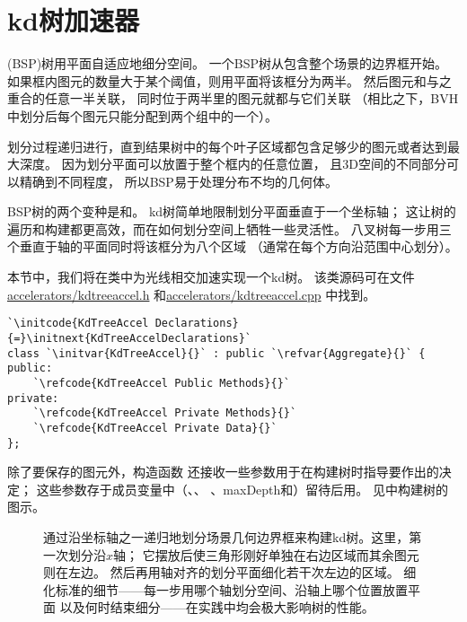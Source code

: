 \section{kd树加速器}\label{sec:kd树加速器}

(BSP)树用平面自适应地细分空间。
一个BSP树从包含整个场景的边界框开始。
如果框内图元的数量大于某个阈值，则用平面将该框分为两半。
然后图元和与之重合的任意一半关联，
同时位于两半里的图元就都与它们关联
（相比之下，BVH中划分后每个图元只能分配到两个组中的一个）。

划分过程递归进行，直到结果树中的每个叶子区域都包含足够少的图元或者达到最大深度。
因为划分平面可以放置于整个框内的任意位置，
且3D空间的不同部分可以精确到不同程度，
所以BSP易于处理分布不均的几何体。

BSP树的两个变种是和。
kd树简单地限制划分平面垂直于一个坐标轴；
这让树的遍历和构建都更高效，而在如何划分空间上牺牲一些灵活性。
八叉树每一步用三个垂直于轴的平面同时将该框分为八个区域
（通常在每个方向沿范围中心划分）。

本节中，我们将在类中为光线相交加速实现一个kd树。
该类源码可在文件\href{https://github.com/mmp/pbrt-v3/tree/master/src/accelerators/kdtreeaccel.h}{\ttfamily accelerators/kdtreeaccel.h}
和\href{https://github.com/mmp/pbrt-v3/tree/master/src/accelerators/kdtreeaccel.cpp}{\ttfamily accelerators/kdtreeaccel.cpp}
中找到。

\begin{lstlisting}
`\initcode{KdTreeAccel Declarations}{=}\initnext{KdTreeAccelDeclarations}`
class `\initvar{KdTreeAccel}{}` : public `\refvar{Aggregate}{}` {
public:
    `\refcode{KdTreeAccel Public Methods}{}`
private:
    `\refcode{KdTreeAccel Private Methods}{}`
    `\refcode{KdTreeAccel Private Data}{}`
};
\end{lstlisting}

除了要保存的图元外，构造函数
还接收一些参数用于在构建树时指导要作出的决定；
这些参数存于成员变量中（、、
、{\ttfamily maxDepth}和）留待后用。
见中构建树的图示。
\begin{figure}[htbp]
    \centering
    \caption{通过沿坐标轴之一递归地划分场景几何边界框来构建kd树。这里，第一次划分沿$x$轴；
        它摆放后使三角形刚好单独在右边区域而其余图元则在左边。
        然后再用轴对齐的划分平面细化若干次左边的区域。
        细化标准的细节——每一步用哪个轴划分空间、沿轴上哪个位置放置平面
        以及何时结束细分——在实践中均会极大影响树的性能。}
    \label{fig:4.14}
\end{figure}

